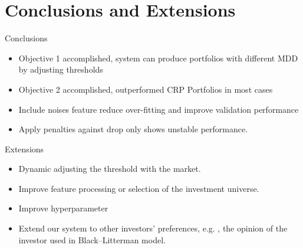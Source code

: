 \section{Conclusions and Extensions}
\begin{frame}{Conclusions}
\begin{itemize}
        \item Objective 1 accomplished, system can produce portfolios with different MDD by adjusting thresholds 
        \item Objective 2 accomplished, outperformed CRP Portfolios in most cases 
        \item Include noises feature reduce over-fitting and improve validation performance
        \item Apply penalties against drop only shows unstable performance. 
\end{itemize}
\end{frame}



\begin{frame}{Extensions}
\begin{itemize}
    \item  Dynamic adjusting the threshold with the market.
    \item Improve feature processing or selection of the investment universe.
    \item Improve hyperparameter
    \item Extend our system to other investors' preferences, e.g. , the opinion of the investor used in Black–Litterman model.
\end{itemize}
\par
\end{frame}